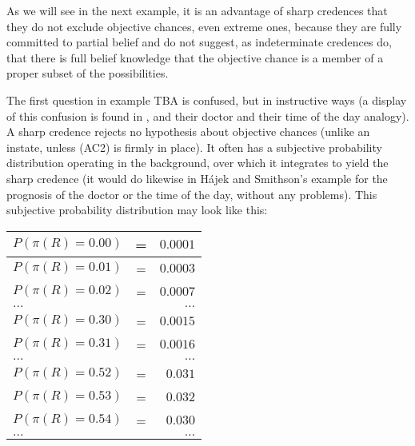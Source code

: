 \documentclass[11pt]{article}
\begin{document}
As we will see in the next example, it is an advantage of sharp
credences that they do not exclude objective chances, even extreme
ones, because they are fully committed to partial belief and do not
suggest, as indeterminate credences do, that there is full belief
knowledge that the objective chance is a member of a proper subset of
the possibilities.


The first question in example TBA\tbd{} is confused, but in
instructive ways (a display of this confusion is found in
, and their doctor and their time of
the day analogy). A sharp credence rejects no hypothesis about
objective chances (unlike an instate, unless (AC2) is firmly in place).
It often has a subjective probability distribution operating in the
background, over which it integrates to yield the sharp credence (it
would do likewise in H{\'a}jek and Smithson's example for the
prognosis of the doctor or the time of the day, without any problems).
This subjective probability distribution may look like this:

\begin{tabular}{|lcr|}
  \hline
  $P(\pi(R)=0.00)$ & = & $0.0001$ \\ \hline
  $P(\pi(R)=0.01)$ & = & $0.0003$ \\ \hline
  $P(\pi(R)=0.02)$ & = & $0.0007$ \\ \hline
  $\ldots$ & & $\ldots$ \\ \hline
  $P(\pi(R)=0.30)$ & = & $0.0015$ \\ \hline
  $P(\pi(R)=0.31)$ & = & $0.0016$ \\ \hline
  $\ldots$ & & $\ldots$ \\ \hline
  $P(\pi(R)=0.52)$ & = & $0.031$ \\ \hline
  $P(\pi(R)=0.53)$ & = & $0.032$ \\ \hline
  $P(\pi(R)=0.54)$ & = & $0.030$ \\ \hline
  $\ldots$ & & $\ldots$ \\ \hline
\end{tabular}
\end{document}
